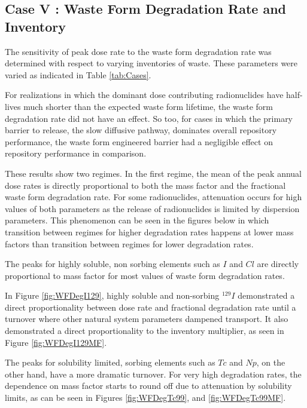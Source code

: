 
\subsection{Case V : Waste Form Degradation Rate and Inventory}

The sensitivity of peak dose rate to the waste form degradation rate was 
determined with respect to varying inventories of waste. These parameters were 
varied as indicated in Table \ref{tab:Cases}.

For realizations in which the dominant dose contributing 
radionuclides have half-lives much shorter than the expected waste form lifetime, 
the waste form degradation rate did not have an effect. So too, for 
cases in which the primary barrier to release, the slow diffusive pathway, 
dominates overall repository performance, the waste form engineered barrier
had a negligible effect on repository performance in comparison.

These results show two regimes. In the first regime, the mean of the peak annual 
dose rates is directly proportional to both the mass factor and the fractional 
waste form degradation rate. For some radionuclides, attenuation occurs for high 
values of both parameters as the release of radionuclides is limited by 
dispersion parameters. This phenomenon can be seen in the figures below in which 
transition between regimes for higher degradation rates happens at lower mass 
factors than transition between regimes for lower degradation rates. 

The peaks for highly soluble, non sorbing elements such as $I$ and $Cl$
are directly proportional to mass factor for most 
values of waste form degradation rates. 

In Figure \ref{fig:WFDegI129}, highly soluble and non-sorbing $^{129}I$ 
demonstrated a direct proportionality between dose rate and fractional 
degradation rate until a turnover where other natural system parameters dampened 
transport. It also demonstrated a direct proportionality to the inventory 
multiplier, as seen in Figure \ref{fig:WFDegI129MF}. 

The peaks for solubility limited, sorbing elements such as $Tc$ and $Np$, on the 
other hand, have a more dramatic turnover.  For very high degradation rates, the 
dependence on mass factor starts to round off due to attenuation by solubility 
limits, as can be seen in Figures 
\ref{fig:WFDegTc99}, and \ref{fig:WFDegTc99MF}.

